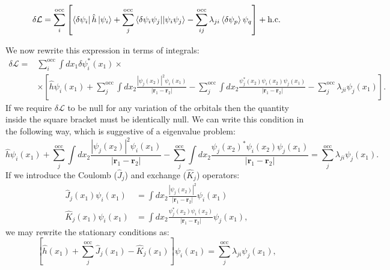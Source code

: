 \documentclass[../Main/chem532-notes.tex]{subfiles}
\begin{document}
\begin{equation}
\begin{split}
\delta \mathcal{L}  =
\sum_i^{\rm occ} \left[ \bra{\delta \psi_i} \hat{h} \ket{\psi_i} 
+ \sum_{j}^{\rm occ} \bra{\delta \psi_i \psi_j}\!\ket{\psi_i \psi_j} - \sum_{ij}^\mathrm{occ} \lambda_{ji} \braket{\delta\psi_p}{\psi_q} \right] + \text{h.c.} 
\end{split}
\end{equation}

We now rewrite this expression in terms of integrals:
\begin{equation}
\begin{split}
\delta \mathcal{L}  =&
\sum_{i}^\mathrm{occ} \int dx_1 \delta\psi_{i}^{*}(x_1) \times \\
& \times
\left[
\hat{h}\psi_{i}(x_1) 
+ \sum_{j}^\mathrm{occ} \int dx_2 \frac{|\psi_{j}(x_2)|^2 \psi_{i}(x_1) }{|\mathbf{r}_1 - \mathbf{r}_2|}
- \sum_{j}^\mathrm{occ} \int dx_2 \frac{\psi_{j}^{*}(x_2) \psi_{i}(x_2) \psi_{j}(x_1) }{|\mathbf{r}_1 - \mathbf{r}_2|}
- \sum_{j}^\mathrm{occ} \lambda_{ji} \psi_{j}(x_1)
\right].
\end{split}
\end{equation}
If we require $\delta \mathcal{L}$ to be null for any variation of the orbitals then the quantity inside the square bracket must be identically null. We can write this condition in the following way, which is suggestive of a eigenvalue problem:
 \begin{equation}
\hat{h}\psi_{i}(x_1) 
+ \sum_{j}^\mathrm{occ} \int dx_2 \frac{|\psi_{j}(x_2)|^2 \psi_{i}(x_1) }{|\mathbf{r}_1 - \mathbf{r}_2|}
- \sum_{j}^\mathrm{occ} \int dx_2 \frac{\psi_{j}(x_2)^{*} \psi_{i}(x_2) \psi_{j}(x_1) }{|\mathbf{r}_1 - \mathbf{r}_2|}
= \sum_{j}^\mathrm{occ} \lambda_{ji} \psi_{j}(x_1).
\end{equation}
If we introduce the Coulomb ($\hat{J}_j$) and exchange ($\hat{K}_j$) operators:
\begin{align}
\hat{J}_j(x_1)\psi_{i}(x_1)  &= \int dx_2 \frac{|\psi_{j}(x_2)|^2}{|\mathbf{r}_1 - \mathbf{r}_2|} \psi_{i}(x_1) \\
\hat{K}_j(x_1)\psi_{i}(x_1)  &= \int dx_2 \frac{\psi_{j}^{*}(x_2) \psi_{i}(x_2)}{|\mathbf{r}_1 - \mathbf{r}_2|} \psi_{j}(x_1),
\end{align}
we may rewrite the stationary conditions as:
 \begin{equation}
\left[ \hat{h}(x_1) + \sum_{j}^\mathrm{occ} \hat{J}_j(x_1)- \hat{K}_j(x_1) \right] \psi_{i}(x_1) 
= \sum_{j}^\mathrm{occ} \lambda_{ji} \psi_{j}(x_1),
\end{equation}
\end{document}
